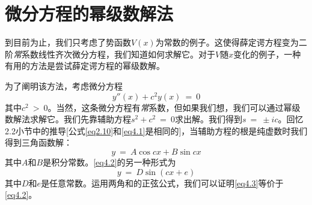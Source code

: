 \documentclass[12pt,a4paper,openany]{ctexbook}
\begin{document}
\section{微分方程的幂级数解法}
\begin{flushleft}
    \setlength{\parindent}{2em}
到目前为止，我们只考虑了势函数$V(x)$为常数的例子。这使得薛定谔方程变为二阶\textit{常}系数线性齐次微分方程，我们知道如何求解它。对于$V$随$x$变化的例子，一种有用的方法是尝试薛定谔方程的幂级数解。

为了阐明该方法，考虑微分方程
\begin{equation}
    y''(x)+c^2y(x)\ =\ 0 \label{eq4.1}
\end{equation}
其中$c^2\ >\ 0$。当然，这条微分方程有\textit{常}系数，但如果我们想，我们可以通过幂级数解法求解它。我们先靠辅助方程$s^2+c^2\ =\ 0$求出解。我们得到$s\ =\ \pm ic$。回忆2.2小节中的推导[公式\eqref{eq2.10}和\eqref{eq4.1}是相同的]，当辅助方程的根是纯虚数时我们得到三角函数解：
\begin{equation}
    y\ =\ A\cos cx+B\sin cx \label{eq4.2}
\end{equation}
其中$A$和$B$是积分常数。\eqref{eq4.2}的另一种形式为
\begin{equation}
    y\ =\ D\sin(cx+e) \label{eq4.3}
\end{equation}
其中$D$和$e$是任意常数。运用两角和的正弦公式，我们可以证明\eqref{eq4.3}等价于\eqref{eq4.2}。


\end{flushleft}
\end{document}
